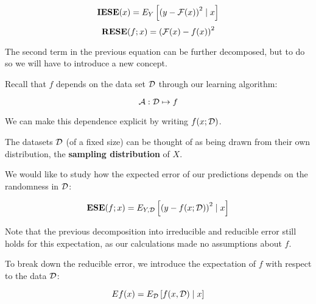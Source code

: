 %
%
\begin{frame}
  $$ \operatorname*{\mathbf{IESE}}(x) = E_Y \left[ \left( y - \operatorname*{\mathcal{F}}(x) \right)^2 \mid x \right] $$
  $$ \operatorname*{\mathbf{RESE}}(f; x) = \left( \operatorname*{\mathcal{F}}(x) - f(x) \right)^2 $$
\end{frame}
%
%
\begin{frame}
  The second term in the previous equation can be further decomposed, but to do
  so we will have to introduce a new concept.  
\end{frame}
%
%
\begin{frame}
  Recall that $f$ depends on the data set $\operatorname*{\mathcal{D}}$ through our learning algorithm:

  $$ \operatorname*{\mathcal{A}} : \operatorname*{\mathcal{D}} \mapsto f $$

  We can make this dependence explicit by writing $f(x; \operatorname*{\mathcal{D}})$.
\end{frame}
%
%
\begin{frame}
  The datasets $\operatorname*{\mathcal{D}}$ (of a fixed size) can be thought of as being drawn from
  their own distribution, the \textbf{sampling distribution} of $X$.   
\end{frame}
%
%
\begin{frame}
  We would like to study how the expected error of our predictions depends on
  the randomness in $\operatorname*{\mathcal{D}}$:

  $$ \operatorname*{\mathbf{ESE}}(f; x) = E_{Y,\operatorname*{\mathcal{D}}} \left[ \left( y - f(x; \operatorname*{\mathcal{D}}) \right)^2 \mid x \right]
  $$

  Note that the previous decomposition into irreducible and reducible error
  still holds for this expectation, as our calculations made no assumptions
  about $f$.
\end{frame}
%
%
\begin{frame}
  To break down the reducible error, we introduce the expectation of $f$ with
  respect to the data $\operatorname*{\mathcal{D}}$:

  $$ Ef(x) = E_{\operatorname*{\mathcal{D}}} \left[ f(x, \operatorname*{\mathcal{D}}) \mid x \right] $$
\end{frame}
%
%
